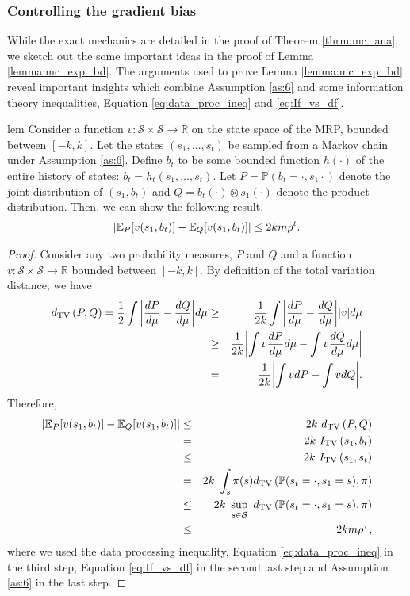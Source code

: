 \documentclass{colt2018} %
\begin{document}
\subsubsection{Controlling the gradient bias}
While the exact mechanics are detailed in the proof of Theorem \ref{thrm:mc_ana}, we sketch out the some important ideas in the proof of Lemma \ref{lemma:mc_exp_bd}. The arguments used to prove Lemma \ref{lemma:mc_exp_bd} reveal important insights which combine Assumption \ref{as:6} and some information theory inequalities, Equation \eqref{eq:data_proc_ineq} and \eqref{eq:If_vs_df}. 
\begin{restatable}[]{lem}{}
\label{lemma:mc_exp_bd}
Consider a function $v: \mathcal{S} \times \mathcal{S} \rightarrow \mathbb{R}$ on the state space of the MRP, bounded between $[-k,k]$. Let the states $(s_1, \ldots, s_t)$ be sampled from a Markov chain under Assumption \ref{as:6}. Define $b_t$ to be some bounded function $h(\cdot)$ of the entire history of states: $b_t = h_t(s_1,\ldots,s_t)$. Let $P = \mathbb{P}(b_t = \cdot, s_1 \cdot)$ denote the joint distribution of $(s_1,b_t)$ and $Q = b_t(\cdot) \otimes s_1(\cdot)$ denote the product distribution.
Then, we can show the following result.
\begin{eqnarray*}
\label{eq:grad_bias_toy}
\abs{\mathbb{E}_{P} [v(s_1,b_t)] - \mathbb{E}_{Q} [v(s_1,b_t)] } \leq 2k m \rho^t. 
\end{eqnarray*}
\end{restatable}
\begin{proof}
Consider any two probability measures, $P$ and $Q$ and a function $v: \mathcal{S} \times \mathcal{S} \rightarrow \mathbb{R}$ bounded between $[-k,k]$. By definition of the total variation distance, we have
\begin{eqnarray*}
d_{\text{TV}}\left( P,Q \right) = \frac{1}{2} \int \abs{\frac{dP}{d\mu} - \frac{dQ}{d\mu}} d\mu &\geq& \frac{1}{2k} \int \abs{\frac{dP}{d\mu} - \frac{dQ}{d\mu}} \abs{v} d\mu \\
&\geq& \frac{1}{2k} \abs{ \int v \frac{dP}{d\mu} d\mu - \int v \frac{dQ}{d\mu} d\mu } \\
&=& \frac{1}{2k} \abs{ \int v dP - \int v dQ }. 
\end{eqnarray*}
Therefore,
\begin{eqnarray*}
\abs{\mathbb{E}_{P} [v(s_1,b_t)] - \mathbb{E}_{Q} [v(s_1,b_t)] } &\leq& 2 k \,\, d_{\text{TV}}\left( P, Q \right) \\
&=& 2 k \,\, I_{\text{TV}}\left( s_1,b_t \right) \\
&\leq& 2 k \,\, I_{\text{TV}}\left( s_1,s_t \right) \\
&=& 2 k \,\, \int_{s} \pi(s) d_{\text{TV}}\left( \mathbb{P}(s_t=\cdot, s_1 = s), \pi \right) \\
&\leq& 2 k \,\, \sup_{s \in \mathcal{S}} \,\, d_{\text{TV}}\left( \mathbb{P}(s_t=\cdot, s_1 = s), \pi \right) \\
&\leq& 2 k m \rho^{\tau}, 
\end{eqnarray*}
where we used the data processing inequality, Equation \eqref{eq:data_proc_ineq} in the third step, Equation \eqref{eq:If_vs_df} in the second last step and Assumption \ref{as:6} in the last step.
\end{proof}
\end{document}
